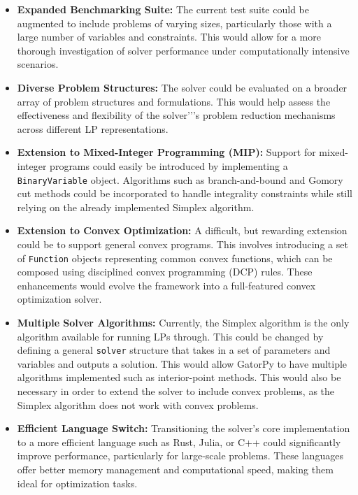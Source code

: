 \documentclass[conference]{IEEEtran}
\begin{document}
\begin{itemize}
    \item \textbf{Expanded Benchmarking Suite:} The current test suite could be augmented to include problems of varying sizes, particularly those with a large number of variables and constraints. 
    This would allow for a more thorough investigation of solver performance under computationally intensive scenarios.

    \item \textbf{Diverse Problem Structures:} The solver could be evaluated on a broader array of problem structures and formulations. 
    This would help assess the effectiveness and flexibility of the solver'’'s problem reduction mechanisms across different LP representations.

    \item \textbf{Extension to Mixed-Integer Programming (MIP):} Support for mixed-integer programs could easily be introduced by implementing a \texttt{BinaryVariable} object. 
    Algorithms such as branch-and-bound and Gomory cut methods could be incorporated to handle integrality constraints while still relying on the already implemented Simplex algorithm.

    \item \textbf{Extension to Convex Optimization:} A difficult, but rewarding extension could be to support general convex programs. 
    This involves introducing a set of \texttt{Function} objects representing common convex functions, which can be composed using disciplined convex programming (DCP) rules. 
    These enhancements would evolve the framework into a full-featured convex optimization solver.

    \item \textbf{Multiple Solver Algorithms:} Currently, the Simplex algorithm is the only algorithm available for running LPs through.
    This could be changed by defining a general \texttt{solver} structure that takes in a set of parameters and variables and outputs a solution.
    This would allow GatorPy to have multiple algorithms implemented such as interior-point methods.
    This would also be necessary in order to extend the solver to include convex problems, as the Simplex algorithm does not work with convex problems.

    \item \textbf{Efficient Language Switch:} Transitioning the solver's core implementation to a more efficient language such as Rust, Julia, or C++ could significantly improve performance, particularly for large-scale problems. 
    These languages offer better memory management and computational speed, making them ideal for optimization tasks.
\end{itemize}
\end{document}
